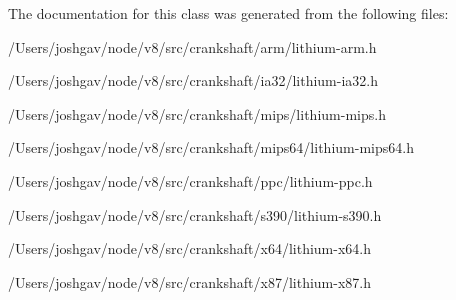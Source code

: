 The documentation for this class was generated from the following files\+:\begin{DoxyCompactItemize}
\item 
/\+Users/joshgav/node/v8/src/crankshaft/arm/lithium-\/arm.\+h\item 
/\+Users/joshgav/node/v8/src/crankshaft/ia32/lithium-\/ia32.\+h\item 
/\+Users/joshgav/node/v8/src/crankshaft/mips/lithium-\/mips.\+h\item 
/\+Users/joshgav/node/v8/src/crankshaft/mips64/lithium-\/mips64.\+h\item 
/\+Users/joshgav/node/v8/src/crankshaft/ppc/lithium-\/ppc.\+h\item 
/\+Users/joshgav/node/v8/src/crankshaft/s390/lithium-\/s390.\+h\item 
/\+Users/joshgav/node/v8/src/crankshaft/x64/lithium-\/x64.\+h\item 
/\+Users/joshgav/node/v8/src/crankshaft/x87/lithium-\/x87.\+h\end{DoxyCompactItemize}
